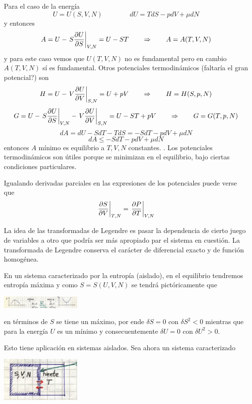 \documentclass[10pt,oneside]{CBFT_book}
\begin{document}
Para el caso de la energía
\[
	U=U(S,V,N) \qquad \qquad dU = TdS - pdV + \mu dN
\]
y entonces
\[
	A = U - \left. S\frac{\partial^{\hspace{-0.05em}} {U}}{\partial {S}^{\hspace{-0.05em}}}\right|_{V,N} = U - ST \qquad \Rightarrow \qquad  A=A(T,V,N)
\]
y para este caso vemos que $U(T,V,N)$ no es fundamental pero en cambio $A(T,V,N)$ sí es fundamental.
Otros potenciales termodinámicos (faltaría el gran potencial?) son
\[
	H = U - \left. V\frac{\partial^{\hspace{-0.05em}} {U}}{\partial {V}^{\hspace{-0.05em}}}\right|_{S,N} = U + pV \qquad \Rightarrow \qquad  H=H(S,p,N)
\]
\[
	G = U - \left. S\frac{\partial^{\hspace{-0.05em}} {U}}{\partial {S}^{\hspace{-0.05em}}}\right|_{V,N} - \left. V\frac{\partial^{\hspace{-0.05em}} {U}}{\partial {V}^{\hspace{-0.05em}}}\right|_{S,N} = 
	U - ST + pV \qquad \Rightarrow \qquad  G=G(T,p,N)
\]
\[
	dA = dU - SdT - TdS = -SdT - pdV + \mu dN
\]
\[
	dA \leq -SdT - pdV + \mu dN 
\]
entonces $A$ mínimo es equilibrio a $T,V,N$ constantes.
.
Los potenciales termodinámicos son útiles porque se minimizan en el equilibrio, bajo ciertas condiciones
particulares.

Igualando derivadas parciales en las expresiones de los potenciales puede verse que 
\[
	\left.\frac{\partial^{\hspace{-0.05em}} {S}}{\partial {V}^{\hspace{-0.05em}}}\right|_{T,N} = \left.\frac{\partial^{\hspace{-0.05em}} {P}}{\partial {T}^{\hspace{-0.05em}}}\right|_{V,N}
\]

La idea de las transformadas de Legendre es pasar la dependencia de cierto juego de variables a otro
que podría ser más apropiado par el sistema en cuestión. La transformada de Legendre conserva el 
carácter de diferencial exacto y de función homogénea.


En un sistema caracterizado por la entropía (aislado), en el equilibrio tendremos
entropía máxima y como $S=S(U,V,N)$ se tendrá pictóricamente que 

\includegraphics[width=0.30\textwidth]{images/1606329075.jpg}

en términos de $S$ se tiene un máximo, por ende $\delta S=0$ con $\delta S^2 < 0$
mientras que para la energía $U$ es un mínimo y consecuentemente 
$\delta U=0$ con $\delta U^2 > 0$.

Esto tiene aplicación en sistemas aislados. Sea ahora un sistema caracterizado 

\includegraphics[width=0.30\textwidth]{images/1606329081.jpg}
\end{document}
